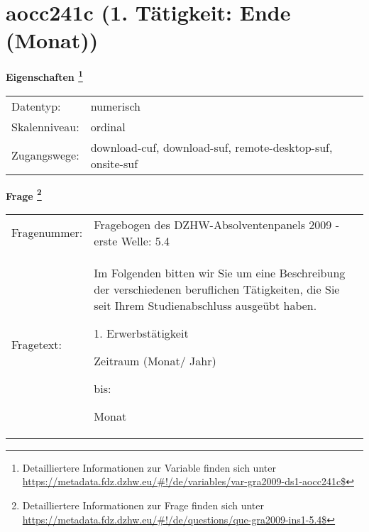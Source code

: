 
    \setcounter{footnote}{0}

    \vspace*{-1.8cm}
	\section{aocc241c (1. Tätigkeit: Ende (Monat))}
	\label{section:aocc241c}



    \vspace*{0.5cm}
    \noindent\textbf{Eigenschaften
	\footnote{Detailliertere Informationen zur Variable finden sich unter
		\url{https://metadata.fdz.dzhw.eu/\#!/de/variables/var-gra2009-ds1-aocc241c$}}}\\
	\begin{tabularx}{\hsize}{@{}lX}
	Datentyp: & numerisch \\
	Skalenniveau: & ordinal \\
	Zugangswege: &
	  download-cuf, 
	  download-suf, 
	  remote-desktop-suf, 
	  onsite-suf
 \\
    \end{tabularx}



				\vspace*{0.5cm}
                \noindent\textbf{Frage
	                \footnote{Detailliertere Informationen zur Frage finden sich unter
		              \url{https://metadata.fdz.dzhw.eu/\#!/de/questions/que-gra2009-ins1-5.4$}}}\\
				\begin{tabularx}{\hsize}{@{}lX}
					Fragenummer: &
					  Fragebogen des DZHW-Absolventenpanels 2009 - erste Welle:
					  5.4
 \\
					Fragetext: & Im Folgenden bitten wir Sie um eine Beschreibung der verschiedenen beruflichen Tätigkeiten, die Sie seit Ihrem Studienabschluss ausgeübt haben.\par  1. Erwerbstätigkeit\par  Zeitraum (Monat/ Jahr)\par  bis:\par  Monat \\
				\end{tabularx}





